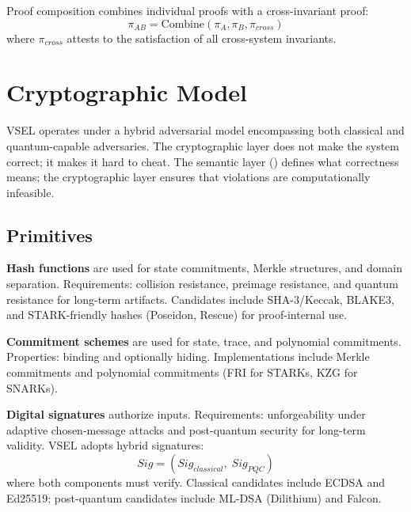 \documentclass[11pt,a4paper]{article}
\theoremstyle{definition}
\begin{document}
Proof composition combines individual proofs with a cross-invariant proof:
\begin{equation}
\pi_{AB} = \mathrm{Combine}(\pi_A, \pi_B, \pi_{\mathit{cross}})
\end{equation}
where $\pi_{\mathit{cross}}$ attests to the satisfaction of all cross-system invariants.

\section{Cryptographic Model}
\label{sec:cryptographic-model}

VSEL operates under a hybrid adversarial model encompassing both classical and quantum-capable adversaries. The cryptographic layer does not make the system correct; it makes it hard to cheat. The semantic layer () defines what correctness means; the cryptographic layer ensures that violations are computationally infeasible.

\subsection{Primitives}
\label{subsec:primitives}

\noindent\textbf{Hash functions} are used for state commitments, Merkle structures, and domain separation. Requirements: collision resistance, preimage resistance, and quantum resistance for long-term artifacts. Candidates include SHA-3/Keccak, BLAKE3, and STARK-friendly hashes (Poseidon, Rescue) for proof-internal use.

\noindent\textbf{Commitment schemes} are used for state, trace, and polynomial commitments. Properties: binding and optionally hiding. Implementations include Merkle commitments and polynomial commitments (FRI for STARKs, KZG for SNARKs).

\noindent\textbf{Digital signatures} authorize inputs. Requirements: unforgeability under adaptive chosen-message attacks and post-quantum security for long-term validity. VSEL adopts hybrid signatures:
\begin{equation}
\mathit{Sig} = (\mathit{Sig}_{\mathit{classical}},\; \mathit{Sig}_{\mathit{PQC}})
\end{equation}
where both components must verify. Classical candidates include ECDSA and Ed25519; post-quantum candidates include ML-DSA (Dilithium) and Falcon.
\end{document}
